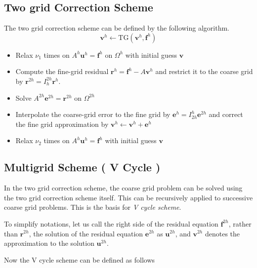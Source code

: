 \documentclass[a4paper]{report}
\begin{document}
	\subsection{Two grid Correction Scheme}
	The two grid correction scheme can be defined by the following algorithm.
	$$ \mathbf{v}^h \leftarrow \text{TG}(\mathbf{v}^h, \mathbf{f}^h) $$
	\begin{itemize}
	\item Relax $\nu_1$ times  on $A^h\mathbf{u}^h = \mathbf{f}^h$ on $\Omega^h$ with initial guess $\mathbf{v}$
	\item Compute the fine-grid residual  $\mathbf{r}^h = \mathbf{f}^h - A\mathbf{v}^h$ and restrict it to the coarse grid by $\mathbf{r}^{2h} = I_h^{2h} \mathbf{r}^h$.
	\item Solve $A^{2h} \mathbf{e}^{2h} = \mathbf{r}^{2h}$ on $\Omega^{2h}$
	\item Interpolate the coarse-grid error to the fine grid by $\mathbf{e}^h=I^h_{2h}\mathbf{e}^{2h}$ and correct the fine grid approximation by $\mathbf{v}^h \leftarrow \mathbf{v}^h + \mathbf{e}^h$
	\item Relax $\nu_2$ times  on $A^h\mathbf{u}^h=\mathbf{f}^h$ with initial guess $\mathbf{v}$
	\end{itemize}
	
	\subsection{Multigrid Scheme ( V Cycle )}
	
	In the two grid  correction scheme, the coarse grid problem can be solved using the two grid correction scheme itself. This can be recursively applied to successive coarse grid problems. This is the basis for \textit{V cycle scheme}. 
	
	To simplify notations,  let us call the right side of the  residual equation $\mathbf{f}^{2h}$, rather than $\mathbf{r}^{2h}$, the solution of the residual equation $\mathbf{e}^{2h}$ as $\mathbf{u}^{2h}$, and $\mathbf{v}^{2h}$ denotes the approximation to the solution $\mathbf{u}^{2h}$.
	
	Now the V cycle scheme can be defined as follows
\end{document}
